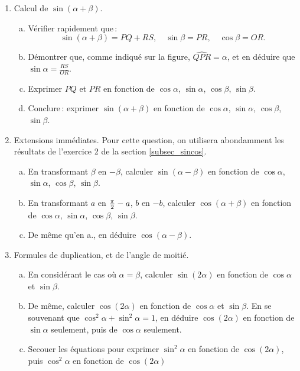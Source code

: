 	\begin{enumerate}
		\item Calcul de $\sin(\alpha+\beta)$.
		\begin{enumerate}[a.]
			\item Vérifier rapidement que\,:
			\begin{equation}
			 	\sin(\alpha+\beta)=PQ+RS,\quad \sin\beta=PR,\quad \cos\beta=OR.
			\end{equation} 
			\item Démontrer que, comme indiqué sur la figure, $\widehat{QPR}=\alpha$, et en déduire que $\sin\alpha=\frac{RS}{OR}$.
			\item Exprimer $PQ$ et $PR$ en fonction de $\cos\alpha$, $\sin\alpha$, $\cos\beta$, $\sin\beta$.
			\item Conclure\,: exprimer $\sin(\alpha+\beta)$ en fonction de $\cos\alpha$, $\sin\alpha$, $\cos\beta$, $\sin\beta$.
		\end{enumerate}
		\item Extensions immédiates. Pour cette question, on utilisera abondamment les résultats de l'exercice 2 de la section \ref{subsec_sincos}.
		\begin{enumerate}[a.]
			\item En transformant $\beta$ en $-\beta$, calculer $\sin(\alpha-\beta)$ en fonction de $\cos\alpha$, $\sin\alpha$, $\cos\beta$, $\sin\beta$.
			\item En transformant $a$ en $\frac{\pi}{2}-a$, $b$ en $-b$, calculer $\cos(\alpha+\beta)$ en fonction de $\cos\alpha$, $\sin\alpha$, $\cos\beta$, $\sin\beta$.
			\item De même qu'en a., en déduire $\cos(\alpha-\beta)$.
		\end{enumerate}
		\item Formules de duplication, et de l'angle de moitié.
		\begin{enumerate}[a.]
			\item En considérant le cas où $\alpha=\beta$, calculer $\sin(2\alpha)$  en fonction de $\cos\alpha$ et $\sin\beta$.
			\item De même, calculer $\cos(2\alpha)$ en fonction de  $\cos\alpha$ et $\sin\beta$. En se souvenant que $\cos^2\alpha+\sin^2\alpha=1$, en déduire $\cos(2\alpha)$ en fonction de $\sin\alpha$ seulement, puis de $\cos\alpha$ seulement.
			\item Secouer les équations pour exprimer $\sin^2\alpha$ en fonction de $\cos(2\alpha)$, puis $\cos^2\alpha$ en fonction de $\cos(2\alpha)$
		\end{enumerate}
	\end{enumerate}

